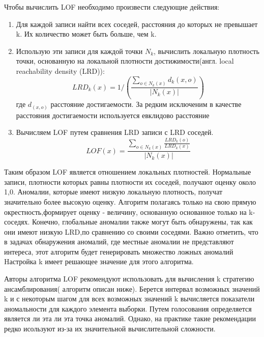  Чтобы вычислить LOF необходимо произвести следующие действия:
 \begin{enumerate}
 	\item Для каждой записи найти всех соседей, расстояния до которых не превышает k. Их количество может быть больше, чем k.
 	\item Использую эти записи для каждой точки $N_k$, вычислить локальную плотность точки, основанную на локальной плотности достижимости(англ. local reachability density (LRD)):
 	\begingroup
 	\Large
 	\begin{equation}
 	LRD_k(x) = 1/(\frac{\sum_{o \in N_k(x)}d_k (x,o)}{|N_k (x)|})
 	\end{equation}
 	\endgroup
 	где \begingroup
 	\Large$d_(x,o)$ \endgroup расстояние достигаемости. За редким исключеним в качестве расстояния достигаемости используется евклидово расстояние \cite{Book12}
 	\item Вычисляем LOF путем сравнения LRD записи с LRD соседей.
 	\begingroup
 	\Large
 	\begin{equation}
 	LOF(x) = \frac{\sum_{o \in N_k(x)}\frac{LRD_k (o)}{LRD_k (x)}}{|N_k (x)|}
 	\end{equation}
 	\endgroup
 \end{enumerate}
 Таким образом LOF является отношением локальных плотностей.  Нормальные записи, плотности которых равны плотности их соседей, получают оценку около 1,0. Аномалии, которые имеют низкую локальную плотность, получат значительно более высокую оценку. Алгоритм полагаясь только на свою прямую окрестность,формирует  оценку - величину, основанную основанное только на k-соседях. Конечно, глобальные аномалии также могут быть обнаружены, так как они  имеют низкую LRD,по сравнению со своими соседями. Важно отметить, что в задачах обнаружения аномалий, где местные аномалии не представляют интереса, этот алгоритм будет генерировать множество ложных аномалий Hастройка k имеет решающее значение для этого алгоритма.
 
 Авторы алгоритма LOF рекомендуют использовать для вычисления k стратегию ансамблирования( алгоритм описан ниже). Берется интервал возможных значений k и с некоторым шагом для всех возможных значений k вычисляется показатели аномальности для каждого элемента выборки. Путем голосования определяется является ли эта ли эта точка аномалий. Однако, на практике такие рекомендации редко исользуют из-за их значительной вычислительной сложности.

